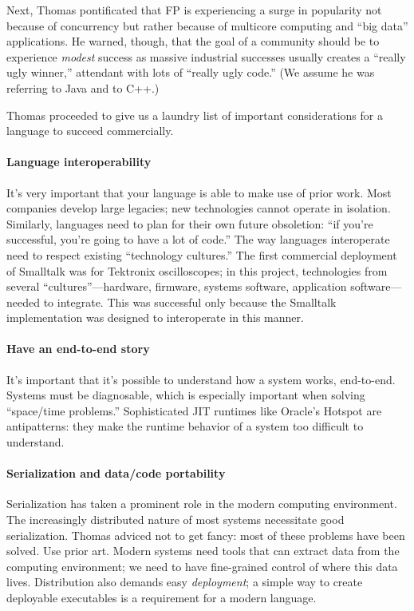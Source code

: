 \documentclass{jfp1}
\begin{document}
Next, Thomas pontificated that FP is experiencing a surge in
popularity not because of concurrency but rather because of multicore
computing and ``big data'' applications. He warned, though, that 
the goal of a community should be to experience \textit{modest}
success as massive industrial successes usually creates a ``really ugly
winner,'' attendant with lots of ``really ugly code.'' (We assume he
was referring to Java and to C++.)

Thomas proceeded to give us a laundry list of important
considerations for a language to succeed commercially.


\paragraph{Language interoperability} It's very important that your
language is able to make use of prior work. Most companies develop
large legacies; new technologies cannot operate in isolation.
Similarly, languages need to  plan for their own future obsoletion:
``if you're successful, you're going to have a lot of code.'' The way
languages interoperate need to respect existing ``technology
cultures.'' The first commercial deployment of Smalltalk was for
Tektronix oscilloscopes; in this project, technologies from several
``cultures''---hardware, firmware, systems software, application
software---needed to integrate. This was successful only because 
the Smalltalk implementation was designed to interoperate in this
manner.

\paragraph{Have an end-to-end story} It's important that it's possible
to understand how a system works, end-to-end. Systems must be
diagnosable, which is especially important when solving 
``space/time problems.'' Sophisticated JIT runtimes like Oracle's Hotspot
are antipatterns: they make the runtime behavior of a system too
difficult to understand.

\paragraph{Serialization and data/code portability} Serialization has
taken a prominent role in the modern computing environment. The 
increasingly distributed nature of most systems necessitate good
serialization. Thomas adviced not to get fancy: most of these problems
have been solved. Use prior art. Modern systems need tools that
can extract data from the computing environment; we need to have
fine-grained control of where this data lives. Distribution also demands
easy \textit{deployment}; a simple way to create deployable executables
is a requirement for a modern language.
\end{document}
